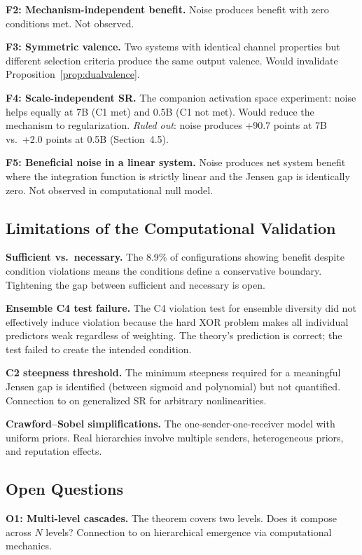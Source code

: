 \documentclass[12pt,letterpaper]{article}
\theoremstyle{definition}
\theoremstyle{remark}
\begin{document}
\textbf{F2: Mechanism-independent benefit.} Noise produces benefit with zero conditions met. Not observed.

\textbf{F3: Symmetric valence.} Two systems with identical channel properties but different selection criteria produce the same output valence. Would invalidate Proposition~\ref{prop:dualvalence}.

\textbf{F4: Scale-independent SR.} The companion activation space experiment: noise helps equally at 7B (C1 met) and 0.5B (C1 not met). Would reduce the mechanism to regularization. \emph{Ruled out}: noise produces +90.7 points at 7B vs.\ +2.0 points at 0.5B (Section~4.5).

\textbf{F5: Beneficial noise in a linear system.} Noise produces net system benefit where the integration function is strictly linear and the Jensen gap is identically zero. Not observed in computational null model.


\subsection{Limitations of the Computational Validation}

\textbf{Sufficient vs.\ necessary.} The 8.9\% of configurations showing benefit despite condition violations means the conditions define a conservative boundary. Tightening the gap between sufficient and necessary is open.

\textbf{Ensemble C4 test failure.} The C4 violation test for ensemble diversity did not effectively induce violation because the hard XOR problem makes all individual predictors weak regardless of weighting. The theory's prediction is correct; the test failed to create the intended condition.

\textbf{C2 steepness threshold.} The minimum steepness required for a meaningful Jensen gap is identified (between sigmoid and polynomial) but not quantified. Connection to \citet{chapeau1997} on generalized SR for arbitrary nonlinearities.

\textbf{Crawford--Sobel simplifications.} The one-sender-one-receiver model with uniform priors. Real hierarchies involve multiple senders, heterogeneous priors, and reputation effects.


\subsection{Open Questions}

\textbf{O1: Multi-level cascades.} The theorem covers two levels. Does it compose across $N$ levels? Connection to \citet{rosas2024} on hierarchical emergence via computational mechanics.
\end{document}
